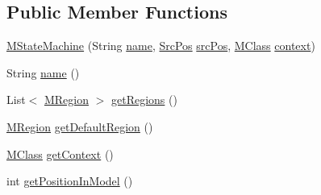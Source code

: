 \subsection*{Public Member Functions}
\begin{DoxyCompactItemize}
\item 
\hyperlink{classorg_1_1tzi_1_1use_1_1uml_1_1mm_1_1statemachines_1_1_m_state_machine_a36a011b6dab8f6bf56212a686e6cdce9}{M\-State\-Machine} (String \hyperlink{classorg_1_1tzi_1_1use_1_1uml_1_1mm_1_1statemachines_1_1_m_state_machine_a538bcb13ae44862dd544ce80edc5fee5}{name}, \hyperlink{classorg_1_1tzi_1_1use_1_1parser_1_1_src_pos}{Src\-Pos} \hyperlink{classorg_1_1tzi_1_1use_1_1uml_1_1mm_1_1statemachines_1_1_m_state_machine_a4892c5ab13ec73b51355c89b1eeb0cf1}{src\-Pos}, \hyperlink{interfaceorg_1_1tzi_1_1use_1_1uml_1_1mm_1_1_m_class}{M\-Class} \hyperlink{classorg_1_1tzi_1_1use_1_1uml_1_1mm_1_1statemachines_1_1_m_state_machine_abbb45f526adbcec12caa20ac6acb770b}{context})
\item 
String \hyperlink{classorg_1_1tzi_1_1use_1_1uml_1_1mm_1_1statemachines_1_1_m_state_machine_ab8f2492751e21d40f55435b12e2f89eb}{name} ()
\item 
List$<$ \hyperlink{classorg_1_1tzi_1_1use_1_1uml_1_1mm_1_1statemachines_1_1_m_region}{M\-Region} $>$ \hyperlink{classorg_1_1tzi_1_1use_1_1uml_1_1mm_1_1statemachines_1_1_m_state_machine_acc6d0655499df98e7c90134acf040577}{get\-Regions} ()
\item 
\hyperlink{classorg_1_1tzi_1_1use_1_1uml_1_1mm_1_1statemachines_1_1_m_region}{M\-Region} \hyperlink{classorg_1_1tzi_1_1use_1_1uml_1_1mm_1_1statemachines_1_1_m_state_machine_a1f60d7f69152ff997ad997fbdd19b1db}{get\-Default\-Region} ()
\item 
\hyperlink{interfaceorg_1_1tzi_1_1use_1_1uml_1_1mm_1_1_m_class}{M\-Class} \hyperlink{classorg_1_1tzi_1_1use_1_1uml_1_1mm_1_1statemachines_1_1_m_state_machine_a17857cd1e343d08199465ddb7c754632}{get\-Context} ()
\item 
int \hyperlink{classorg_1_1tzi_1_1use_1_1uml_1_1mm_1_1statemachines_1_1_m_state_machine_a79405f4cdccae597e06ee026bcd58c97}{get\-Position\-In\-Model} ()
\end{DoxyCompactItemize}
